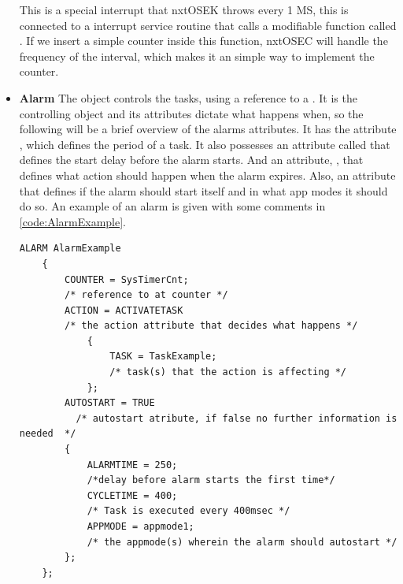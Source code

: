 \begin{itemize}
    This is a special interrupt that nxtOSEK throws every 1 MS, this is connected to a interrupt service routine that calls a modifiable function called . If we insert a simple counter inside this function, nxtOSEC will handle the frequency of the interval, which makes it an simple way to implement the counter.
    \item{\textbf{Alarm}}
    The  object controls the tasks, using a reference to a . It is the controlling object and its attributes dictate what happens when, so the following will be a brief overview of the alarms attributes. It has the attribute , which defines the period of a task. It also possesses an attribute called  that defines the start delay before the alarm starts. And an attribute, , that defines what action should happen when the alarm expires. Also, an  attribute that defines if the alarm should start itself and in what app modes it should do so.  An example of an alarm is given with some comments in \ref{code:AlarmExample}.
    
    \begin{lstlisting}[frame=single, label={code:AlarmExample}, caption={A example of an alarm in OIL}, xleftmargin=.00\textwidth, xrightmargin=.00\textwidth]
    ALARM AlarmExample
    {
        COUNTER = SysTimerCnt;
        /* reference to at counter */
        ACTION = ACTIVATETASK 
        /* the action attribute that decides what happens */
            {
                TASK = TaskExample;
                /* task(s) that the action is affecting */
            };
        AUTOSTART = TRUE
          /* autostart atribute, if false no further information is needed  */
        { 
            ALARMTIME = 250;
            /*delay before alarm starts the first time*/
            CYCLETIME = 400; 
            /* Task is executed every 400msec */
            APPMODE = appmode1;
            /* the appmode(s) wherein the alarm should autostart */
        };
    };
    \end{lstlisting}
\end{itemize}
